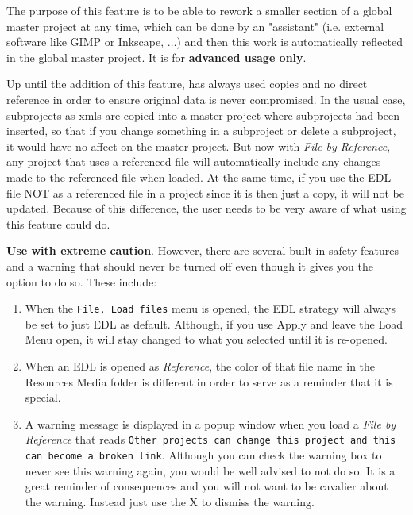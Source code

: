 The purpose of this feature is to be able to rework a smaller
section of a global master project at any time, which can be done by
an "assistant" (i.e. external software like GIMP or Inkscape, $\dots$) and then this work is automatically reflected in the
global master project.  It is for \textbf{advanced usage only}.

Up until the addition of this feature, \CGG{} has always used copies
and no direct reference in order to ensure original data is never
compromised.  In the usual case, subprojects as xmls are copied into
a master project where subprojects had been inserted, so that if you
change something in a subproject or delete a subproject, it would
have no affect on the master project.  But now with \textit{File by
	Reference}, any project that uses a referenced file will
automatically include any changes made to the referenced file when
loaded.  At the same time, if you use the EDL file NOT as a
referenced file in a project since it is then just a copy, it will
not be updated.  Because of this difference, the user needs to be
very aware of what using this feature could do.

\textbf{Use with extreme caution}.  However, there are several
built-in safety features and a warning that should never be turned
off even though it gives you the option to do so.  These include:

\begin{enumerate}
	\item When the \texttt{File, Load files} menu is opened, the EDL
	strategy will always be set to just EDL as default.  Although, if
	you use Apply and leave the Load Menu open, it will stay changed to
	what you selected until it is re-opened.
	\item When an EDL is opened as \textit{Reference}, the color of
	that file name in the Resources Media folder is different in order
	to serve as a reminder that it is special.
	\item A warning message is displayed in a popup window when you
	load a \textit{File by Reference} that reads \texttt{Other projects can
	change this project and this can become a broken link}.  Although
	you can check the warning box to never see this warning again, you
	would be well advised to not do so.  It is a great reminder of
	consequences and you will not want to be cavalier about the warning.
	Instead just use the X to dismiss the warning.
\end{enumerate}

